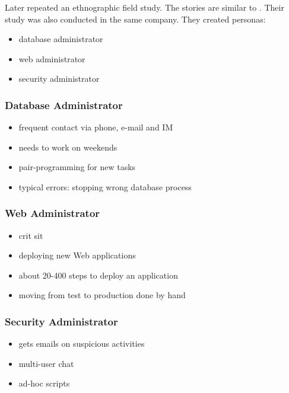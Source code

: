 \begin{frame}
	\frametitle{\citet{haber2007design}}

	Later \citet{haber2007design} repeated an ethnographic field study.
	The stories are similar to \citet{barrett2004field}.
	Their study was also conducted in the same company.
	They created personas:

	\begin{itemize}
	\item database administrator
	\item web administrator
	\item security administrator
	\end{itemize}
\end{frame}



\begin{frame}
	\frametitle{Database Administrator~\cite{haber2007design}}

	\begin{itemize}[<+-| alert@+>]
	\item frequent contact via phone, e-mail and IM
	\item needs to work on weekends
	\item pair-programming for new tasks
	\item typical errors: stopping wrong database process
	\end{itemize}
\end{frame}

\begin{frame}
	\frametitle{Web Administrator~\cite{haber2007design}}

	\begin{itemize}[<+-| alert@+>]
	\item crit sit
	\item deploying new Web applications
	\item about 20-400 steps to deploy an application
	\item moving from test to production done by hand
	\end{itemize}
\end{frame}

\begin{frame}
	\frametitle{Security Administrator~\cite{haber2007design}}

	\begin{itemize}[<+-| alert@+>]
	\item gets emails on suspicious activities
	\item multi-user chat
	\item ad-hoc scripts
	\end{itemize}
\end{frame}


